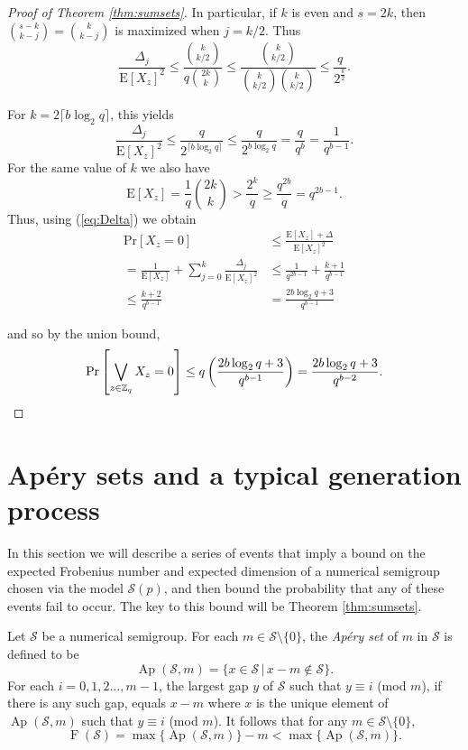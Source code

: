 \documentclass[11pt]{amsart}
\theoremstyle{definition}
\theoremstyle{remark}
\def\ZZ{\ensuremath{\mathbb{Z}}}
\def\Pr{\ensuremath{\mathrm{Pr}}}
\def\EE{\ensuremath{\mathrm{E}}}
\def\nsg{\ensuremath{\mathcal{S}}}
\DeclareMathOperator\F{F}
\DeclareMathOperator\Ap{Ap}
\begin{document}
\begin{proof}[Proof of Theorem \ref{thm:sumsets}]
In particular, if $k$ is even and $s=2k$, then $\binom{s - k}{k - j} = \binom{k}{k-j}$ is maximized when $j=k/2$. Thus
\[ \frac{\Delta_j}{\EE[X_z]^2} \leq \frac{\binom{k}{k/2}}{q \binom{2k}{k}} \leq \frac{\binom{k}{k/2}}{\binom{k}{k/2}\binom{k}{k/2}} \leq \frac{q}{2^{\frac{k}{2}}}.\]

  For $k=2 \lceil b\log_2 q \rceil$, this yields
  \[ \frac{\Delta_j}{\EE[X_z]^2} \leq \frac{q}{2^{\lceil b \log_2 q \rceil}} \leq \frac{q}{2^{b \log_2 q }} = \frac{q}{q^{b}} = \frac{1}{q^{b-1}}.\]
  For the same value of $k$ we also have
\[ \EE[X_z] = \frac{1}{q} \binom{2k}{k} > \frac{2^k}{q} \geq \frac{q^{2b}}{q}=q^{2b-1}.\] 
  Thus, using (\ref{eq:Delta}) we obtain
  \begin{align*} \Pr[X_z = 0] & \leq \frac{\EE[X_z]+\Delta}{\EE[X_z]^2} \\
     = \frac{1}{\EE[X_z]} + \sum_{j=0}^k\frac{\Delta_j}{\EE[X_z]^2} & \leq \frac{1}{q^{2b-1}}+\frac{k+1}{q^{b-1}} \\
      \leq \frac{k+2}{q^{b-1}} & = \frac{2b \log_2 q + 3}{q^{b-1}}
    \end{align*}
 
  and so by the union bound,
  \[ \Pr \left[ \bigvee_{z \in \ZZ_q} X_z = 0 \right] \leq q \left( \frac{2b \log_2 q + 3}{q^{b-1}}\right) = \frac{2b \log_2 q + 3}{q^{b-2}}. \qedhere \]
\end{proof}


\section{Ap\'ery sets and a typical generation process}
In this section we will describe a series of events that imply a bound on the expected Frobenius number and expected dimension of a numerical semigroup chosen via the model $\nsg(p)$, and then bound the probability that any of these events fail to occur. The key to this bound will be Theorem \ref{thm:sumsets}.

Let $\nsg$ be a numerical semigroup. For each $m \in \nsg \setminus \{0\}$, the \emph{Ap\'ery set} of $m$ in $\nsg$ is defined to be
\[ \Ap(\nsg, m) = \{x \in \nsg \, | \, x - m \notin \nsg \}.\]
For each $i = 0,1,2\dots,m-1$, the largest gap $y$ of $\nsg$ such that $y \equiv i$ (mod $m$), if there is any such gap, equals $x - m$ where $x$ is the unique element of $\Ap(\nsg, m)$ such that $y \equiv i$ (mod $m$). It follows that for any $m \in \nsg \setminus \{0\}$,
\begin{equation} \F(\nsg) = \max \{ \Ap(\nsg, m) \} - m < \max \{ \Ap(\nsg, m) \}. \label{eq:Apery} \end{equation}
\end{document}
